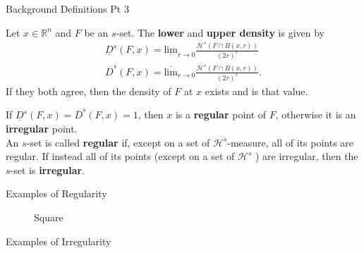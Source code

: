\documentclass[10pt]{beamer}
\begin{document}
\begin{frame}{Background Definitions Pt 3}


\begin{definition}
	Let \(x \in \mathbb{R}^{n}\) and \(F\) be an \(s\)-set. The \textbf{lower} and \textbf{upper density} is given by
	\begin{align*}
		\underline{D}^{s}(F,x) = \underline{\textrm{lim}}_{r\to 0} \frac{\mathcal{H}^{s}(F\cap B(x,r))}{(2r)^{s}}\\
		\overline{D}^{s}(F,x) = \overline{\textrm{lim}}_{r\to 0} \frac{\mathcal{H}^{s}(F\cap B(x,r))}{(2r)^{s}}.
	\end{align*}
	If they both agree, then the density of \(F\) at \(x\) exists and is that value.
\end{definition}

\begin{definition}
	If \(\underline{D}^{s}(F,x) = \overline{D}^{s}(F,x) = 1\), then \(x\) is a \textbf{regular} point of \(F\), otherwise it is an \textbf{irregular} point.\\

	An \(s\)-set is called \textbf{regular} if, except on a set of \(\mathcal{H}^{s}\)-measure, all of its points are regular. If instead all of its points (except on a set of \(\mathcal{H}^{s}\) ) are irregular, then the \(s\)-set is \textbf{irregular}.
\end{definition}
\end{frame}

\begin{frame}{Examples of Regularity}
\begin{figure}[ht]
    \centering
     \def\svgwidth{1\linewidth}
     
    \caption{Square}
    \label{fig:square}
\end{figure}
\end{frame}

\begin{frame}{Examples of Irregularity}
\end{frame}
\end{document}
